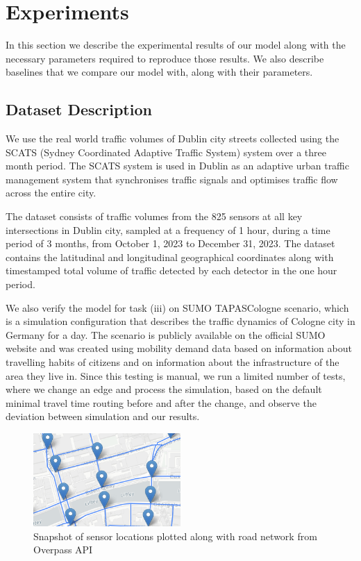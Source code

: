 \documentclass[conference]{IEEEtran}
\begin{document}
\section{Experiments}

In this section we describe the experimental results of our model along with the necessary parameters required to reproduce those results. We also describe baselines that we compare our model with, along with their parameters.

\subsection{Dataset Description}

We use the real world traffic volumes of Dublin city streets collected using the SCATS (Sydney Coordinated Adaptive Traffic System)\cite{scats} system over a three month period. The SCATS system is used in Dublin as an adaptive urban traffic management system that synchronises traffic signals and optimises traffic flow across the entire city.

The dataset consists of traffic volumes from the 825 sensors at all key intersections in Dublin city, sampled at a frequency of 1 hour, during a time period of 3 months, from October 1, 2023 to December 31, 2023. The dataset contains the latitudinal and longitudinal geographical coordinates along with timestamped total volume of traffic detected by each detector in the one hour period.

We also verify the model for task (iii) on SUMO\cite{sumo} TAPASCologne scenario\cite{tapas}, which is a simulation configuration that describes the traffic dynamics of Cologne city in Germany for a day. The scenario is publicly available on the official SUMO website and was created using mobility demand data based on information about travelling habits of citizens and on information about the infrastructure of the area they live in. Since this testing is manual, we run a limited number of tests, where we change an edge and process the simulation, based on the default minimal travel time routing before and after the change, and observe the deviation between simulation and our results.

\begin{figure}[htbp]
  \centering
  \includegraphics[width=0.5\textwidth]{dataset.png}
  \caption{Snapshot of sensor locations plotted along with road network from Overpass API}
  \label{fig:dataset}
\end{figure}
\end{document}
